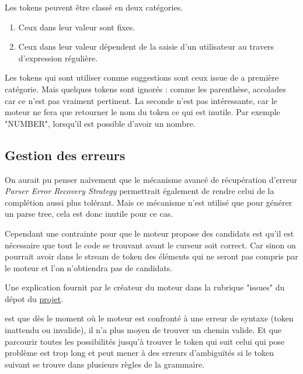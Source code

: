 \documentclass[
    iict, %
    il, %
]{heig-tb}
\begin{document}
Les tokens peuvent être classé en deux catégories.

\begin{enumerate}
    \item Ceux dans leur valeur sont fixes.
    \item Ceux dans leur valeur dépendent de la saisie d'un utilisateur au travers d'expression régulière.
\end{enumerate}

Les tokens qui sont utiliser comme suggestions sont ceux issue de a première catégorie. Mais quelques tokens sont ignorés : comme les parenthèse, accolades car ce n'est pas vraiment pertinent. %
La seconde n'est pas intéressante, car le moteur ne fera que retourner le nom du token ce qui est inutile. Par exemple "NUMBER", lorsqu'il est possible d'avoir un nombre.

\subsection{Gestion des erreurs }\label{error handle}

On aurait pu penser naïvement que le mécanisme avancé de récupération d'erreur \emph{Parser Error Recovery Strategy} permettrait également de rendre celui de la complétion aussi plus tolérant.
Mais ce mécanisme n'est utilisé que pour générer un parse tree, cela est donc inutile pour ce cas. %

Cependant une contrainte pour que le moteur propose des candidats est qu'il est nécessaire que tout le code se trouvant avant le curseur soit correct.
Car sinon on pourrait avoir dans le stream de token des éléments qui ne seront pas compris par le moteur et l'on n'obtiendra pas de candidats.

Une explication fournit par le créateur du moteur dans la rubrique "issues" du dépot du \href{ https://github.com/mike-lischke/antlr4-c3/issues/29}{projet}.

est que dès le moment où le moteur est confronté à une erreur de syntaxe (token inattendu ou invalide), il n'a plus moyen de trouver un chemin valide.
Et que parcourir toutes les possibilités jusqu'à trouver le token qui suit celui qui pose problème est trop long et peut mener à des erreurs d'ambiguïtés si le token suivant se trouve dans plusieurs règles de la grammaire.
\end{document}
